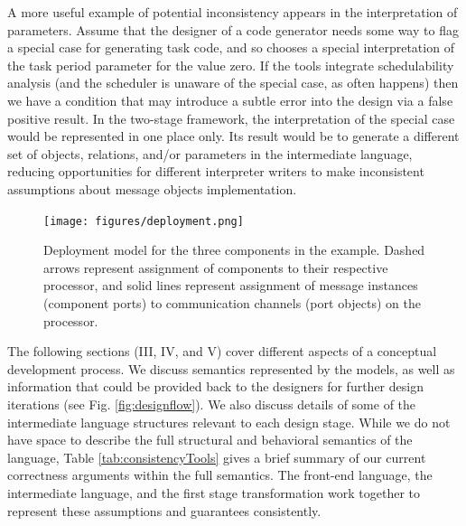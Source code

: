 A more useful example of potential inconsistency appears in the interpretation of parameters.  
Assume that the designer of a code generator needs some way to flag a special case for generating 
task code, and so chooses a special interpretation of the task period parameter for the value 
zero.  If the tools integrate schedulability analysis (and the scheduler is unaware of the 
special case, as often happens) then we have a condition that may introduce a subtle error 
into the design via a false positive result.  In the two-stage framework, the interpretation 
of the special case would be represented in one place only.  Its result would be to generate 
a different set of objects, relations, and/or parameters in the intermediate language, reducing 
opportunities for different interpreter writers to make inconsistent assumptions about message 
objects implementation.

\begin{figure}
\centering
\texttt{[image: figures/deployment.png]}
    \caption{Deployment model for the three components in the example.  Dashed arrows 
represent assignment of components to their respective processor, and solid lines represent 
assignment of message instances (component ports) to communication channels (port objects) 
on the processor.}
    \label{fig:deploy}
\end{figure}


The following sections (III, IV, and V) cover different aspects of a conceptual development 
process. We discuss semantics represented by the models, as well as information that could 
be provided back to the designers for further design iterations (see Fig. \ref{fig:designflow}).  
We also discuss details of some of the intermediate language structures relevant to each design 
stage.  While we do not have space to describe the full structural and behavioral semantics of 
the language, Table \ref{tab:consistencyTools} gives a brief summary of our current correctness 
arguments within the full semantics.  The front-end language, the intermediate language, and 
the first stage transformation work together to represent these assumptions and guarantees 
consistently.

